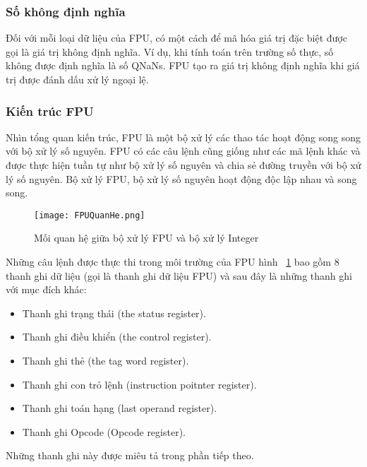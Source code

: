 		\subsubsection*{Số không định nghĩa}
		Đối với mỗi loại dữ liệu của FPU, có một cách để mã hóa giá trị đặc biệt được gọi là giá trị không định nghĩa. Ví dụ, khi tính toán trên trường số thực, số không được định nghĩa là số QNaNs. FPU tạo ra giá trị không định nghĩa khi giá trị được đánh dấu xử lý ngoại lệ.
		
		\subsubsection{Kiến trúc FPU}
		Nhìn tổng quan kiến trúc, FPU là một bộ xử lý các thao tác hoạt động song song với bộ xử lý số nguyên. FPU có các câu lệnh cũng giống như các mã lệnh khác và được thực hiện tuần tự như bộ xử lý số nguyên và chia sẻ đường truyền với bộ xử lý số nguyên. Bộ xử lý FPU, bộ xử lý số nguyên hoạt động độc lập nhau và song song. 
		
		\begin{center}
			\begin{figure}[htp]
				\begin{center}
					\texttt{[image: FPUQuanHe.png]}
				\end{center}
				\caption{Mối quan hệ giữa bộ xử lý FPU và bộ xử lý Integer}				
				\label{fig:FPUQuanHe}				
			\end{figure}
		\end{center}		
		
		Những câu lệnh được thực thi trong môi trường của FPU hình ~\ref{fig:FPUQuanHe} bao gồm 8 thanh ghi dữ liệu (gọi là thanh ghi dữ liệu FPU) và sau đây là những thanh ghi với mục đích khác:
		\begin{itemize}
			\renewcommand{\labelitemi}{\textbullet}	
			\item	Thanh ghi trạng thái (the status register).
			\item	Thanh ghi điều khiển (the control register).
			\item	Thanh ghi thẻ (the tag word register).
			\item	Thanh ghi con trỏ lệnh (instruction poitnter register).
			\item	Thanh ghi toán hạng (last operand register).
			\item	Thanh ghi Opcode (Opcode register).
		\end{itemize}
		
	Những thanh ghi này được miêu tả trong phần tiếp theo.
	
